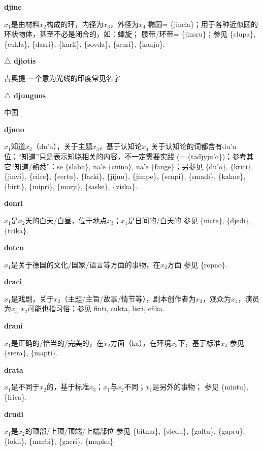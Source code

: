 \documentclass[notitlepage,twocolumn,a4paper,10pt]{book}
\begin{document}
{\sffamily\bfseries djine}\enspace {\ttfamily\bfseries[jin]}  $x_1$是由材料$x_2$构成的环，内径为$x_3$，外径为$x_4$ \textemdash{} 椭圆= \{jincla\}；用于各种近似圆的环状物体，甚至不必是闭合的，如：螺旋； 腰带\slash{}环带= \{jinsru\}；参见 \{clupa\}, \{cukla\}, \{dasri\}, \{karli\}, \{sovda\}, \{sruri\}, \{konju\}.

{\sffamily\bfseries $\triangle$ djiotis} 吉奥提 \textemdash{} 一个意为光线的印度常见名字

{\sffamily\bfseries $\triangle$ djunguos} 中国

{\sffamily\bfseries djuno}\enspace {\ttfamily\bfseries[jun     ju'o]}  $x_1$知道$x_2$（du'u），关于主题$x_3$，基于认知论$x_4$ \textemdash{} 关于认知论的词都含有du'u位；“知道”只是表示知晓相关的内容，不一定需要实践 (= \{tadjyju'o\})；参考其它“知道\slash{}熟悉”：se \{slabu\}, na'e \{cnino\}, na'e \{fange\}；另参见 \{du'o\}, \{krici\}, \{jinvi\}, \{cilre\}, \{certu\}, \{facki\}, \{jijnu\}, \{jimpe\}, \{senpi\}, \{smadi\}, \{kakne\}, \{birti\}, \{mipri\}, \{morji\}, \{saske\}, \{viska\}.

{\sffamily\bfseries donri}\enspace {\ttfamily\bfseries[dor     do'i]}  $x_1$是$x_2$天的白天\slash{}白昼，位于地点$x_3$；$x_1$是日间的\slash{}白天的 \textemdash{} 参见 \{nicte\}, \{djedi\}, \{tcika\}.

{\sffamily\bfseries dotco}\enspace {\ttfamily\bfseries[dot     do'o]}  $x_1$是关于德国的文化\slash{}国家\slash{}语言等方面的事物，在$x_2$方面 \textemdash{} 参见 \{ropno\}.

{\sffamily\bfseries draci} $x_1$是戏剧，关于$x_2$（主题\slash{}主旨\slash{}故事\slash{}情节等），剧本创作者为$x_3$，观众为$x_4$，演员为$x_5$ \textemdash{} $x_2$可能也指习俗；参见 {finti}, {cukta}, {lisri}, {cfika}.

{\sffamily\bfseries drani}\enspace {\ttfamily\bfseries[    dra]}  $x_1$是正确的\slash{}恰当的\slash{}完美的，在$x_2$方面（ka），在环境$x_3$下，基于标准$x_4$ \textemdash{} 参见 \{srera\}, \{mapti\}.

{\sffamily\bfseries drata}\enspace {\ttfamily\bfseries[dat]}  $x_1$是不同于$x_2$的，基于标准$x_3$；$x_1$与$x_2$不同；$x_1$是另外的事物； \textemdash{} 参见 \{mintu\}, \{frica\}.

{\sffamily\bfseries drudi}  $x_1$是$x_2$的顶部\slash{}上顶\slash{}顶端\slash{}上端部位 \textemdash{} 参见 \{bitmu\}, \{stedu\}, \{galtu\}, \{gapru\}, \{loldi\}, \{marbi\}, \{gacri\}, \{mapku\}
\end{document}
